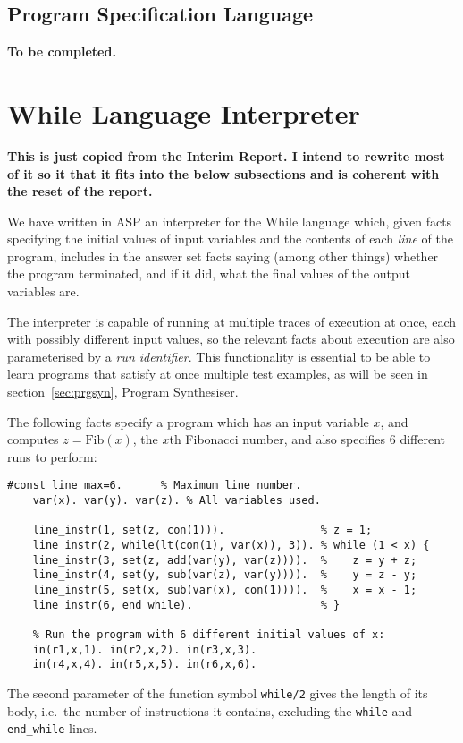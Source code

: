 \documentclass[a4paper,twoside,notitlepage]{article}
\newcommand{\ttt}{\texttt}
\begin{document}
\subsection{Program Specification Language} \label{sec:spclng}
\textbf{To be completed.}

\clearpage 

\section{While Language Interpreter}
\textbf{This is just copied from the Interim Report. I intend to rewrite 
most of it so it that it fits into the below subsections and is coherent 
with the reset of the report.}

We have written in ASP an interpreter for the While language which, given 
facts specifying the initial values of input variables and the contents of 
each \emph{line} of the program, includes in the answer set facts saying 
(among other things) whether the program terminated, and if it did, what the 
final values of the output variables are.

The interpreter is capable of running at multiple traces of execution at once, 
each with possibly different input values, so the relevant facts about 
execution are also parameterised by a \emph{run identifier}. This 
functionality is essential to be able to learn programs that satisfy at once 
multiple test examples, as will be seen in section~\ref{sec:prgsyn}, Program 
Synthesiser.

The following facts specify a program which has an input variable $x$, and 
computes $z = \textrm{Fib}(x)$, the $x$th Fibonacci number, and also specifies 
6 different runs to perform:
\begin{Verbatim}[samepage=true]
    #const line_max=6.      % Maximum line number.
    var(x). var(y). var(z). % All variables used.
    
    line_instr(1, set(z, con(1))).               % z = 1;
    line_instr(2, while(lt(con(1), var(x)), 3)). % while (1 < x) {
    line_instr(3, set(z, add(var(y), var(z)))).  %    z = y + z;
    line_instr(4, set(y, sub(var(z), var(y)))).  %    y = z - y;
    line_instr(5, set(x, sub(var(x), con(1)))).  %    x = x - 1;
    line_instr(6, end_while).                    % }
    
    % Run the program with 6 different initial values of x:
    in(r1,x,1). in(r2,x,2). in(r3,x,3).
    in(r4,x,4). in(r5,x,5). in(r6,x,6).
\end{Verbatim}
The second parameter of the function symbol \texttt{while/2} gives the 
length of its body, i.e.\ the number of instructions it contains, 
excluding the \ttt{while} and \ttt{end\_while} lines.
\end{document}
